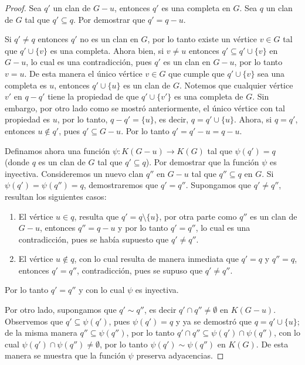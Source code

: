 \documentclass[12pt]{book}
\theoremstyle{definition}
\begin{document}
\begin{proof}
Sea $q'$ un clan de $G-u$, entonces $q'$ es una completa en $G$. Sea $q$ un clan de $G$ tal que $q'\subseteq q$. Por demostrar que $q'=q-u$.

Si $q'\neq q$ entonces $q'$ no es un clan en $G$, por lo tanto existe un vértice $v\in G$ tal que $q' \cup \{v\}$ es una completa. Ahora bien, si $v\neq u$ entonces $q'\subseteq q' \cup \{v\}$ en $G-u$, lo cual es una contradicción, pues $q'$ es un clan en $G-u$, por lo tanto $v=u$. De esta manera el único vértice $v\in G$ que cumple que $q'\cup \{v\}$ sea una completa es $u$, entonces $q'\cup \{u\}$ es un clan de $G$.
Notemos que cualquier vértice $v'$ en $q-q'$ tiene la propiedad de que $q'\cup \{v'\}$ es una completa de $G$. Sin embargo, por otro lado como se mostró anteriormente, el único vértice con tal propiedad es $u$, por lo tanto, $q-q'=\{u\}$, es decir, $q=q'\cup\{u\}$. Ahora, si $q= q'$, entonces $u\not\in q'$, pues $q'\subseteq G-u$. Por lo tanto $q'=q'-u=q-u$. 

Definamos ahora una función $\psi:K(G-u)\to K(G)$ tal que $\psi(q')=q$ (donde $q$ es un clan de $G$ tal que $q'\subseteq q$). Por demostrar que la función $\psi$ es inyectiva. Consideremos un nuevo clan $q''$ en $G-u$ tal que $q''\subseteq q$ en $G$. Si $\psi(q')=\psi(q'')=q$, demostraremos que $q'=q''$. Supongamos que $q'\neq q''$, resultan los siguientes casos:
\begin{enumerate}
\item El vértice $u\in q$, resulta que $q'=q\setminus \{u\}$, por otra parte como $q''$ es un clan de $G-u$, entonces $q''=q-u$ y por lo tanto $q'=q''$, lo cual es una contradicción, pues se había supuesto que $q'\neq q''$.
\item El vértice $u \notin q$, con lo cual resulta de manera inmediata que $q'=q$ y $q''=q$, entonces $q'=q''$, contradicción, pues se supuso que $q'\neq q''$.
\end{enumerate}
Por lo tanto $q'=q''$ y con lo cual $\psi$ es inyectiva.

Por otro lado, supongamos que $q'\sim q''$, es decir $q'\cap q''\neq\emptyset$ en $K(G-u)$. Observemos que $q'\subseteq\psi(q')$, pues $\psi(q')=q$ y ya se demostró que $q=q'\cup\{u\}$; de la misma manera $q''\subseteq\psi(q'')$, por lo tanto $q'\cap q''\subseteq\psi(q')\cap\psi(q'')$, con lo cual $\psi(q')\cap\psi(q'')\neq\emptyset$, por lo tanto $\psi(q')\sim\psi(q'')$ en $K(G)$. De esta manera se muestra que la función $\psi$ preserva adyacencias.

\end{proof}
\end{document}
